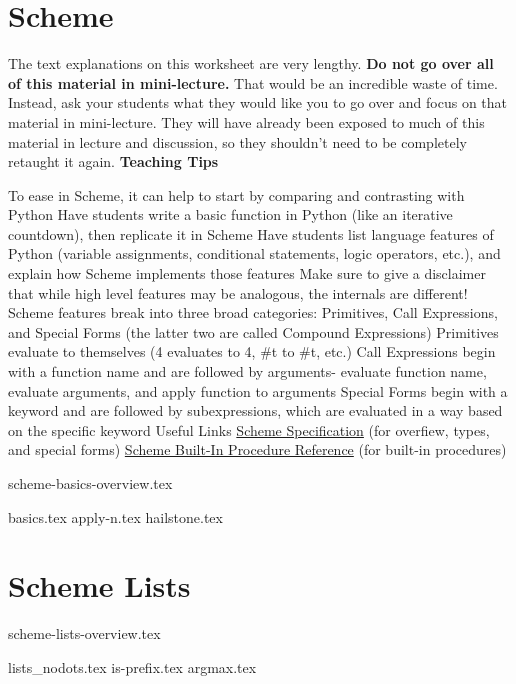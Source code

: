 \documentclass{exam}
\begin{document}
\section{Scheme}
\begin{meta}
The text explanations on this worksheet are very lengthy. \textbf{Do not go over all of this material in mini-lecture.} That would be an incredible waste of time. Instead, ask your students what they would like you to go over and focus on that material in mini-lecture. They will have already been exposed to much of this material in lecture and discussion, so they shouldn't need to be completely retaught it again. 
\textbf{Teaching Tips}
\begin{outline}[enumerate]
    \1 To ease in Scheme, it can help to start by comparing and contrasting with Python
    \2 Have students write a basic function in Python (like an iterative countdown), then replicate it in Scheme
    \2 Have students list language features of Python (variable assignments, conditional statements, logic operators, etc.), and explain how Scheme implements those features
    \2 Make sure to give a disclaimer that while high level features may be analogous, the internals are different!
    \1 Scheme features break into three broad categories: Primitives, Call Expressions, and Special Forms (the latter two are called Compound Expressions)
    \2 Primitives evaluate to themselves (4 evaluates to 4, \#t to \#t, etc.)
    \2 Call Expressions begin with a function name and are followed by arguments- evaluate function name, evaluate arguments, and apply function to arguments
    \2 Special Forms begin with a keyword and are followed by subexpressions, which are evaluated in a way based on the specific keyword
    \1 Useful Links
    \2 \href{https://cs61a.org/articles/scheme-spec/}{Scheme Specification} (for overfiew, types, and special forms)
    \2 \href{https://cs61a.org/articles/scheme-builtins/}{Scheme Built-In Procedure Reference} (for built-in procedures)
\end{outline}
\end{meta}

{scheme-basics-overview.tex}
\begin{questions}
{basics.tex}
{apply-n.tex}
{hailstone.tex}
\end{questions}

\section{Scheme Lists}
{scheme-lists-overview.tex}
\newpage
\begin{questions}
{lists_nodots.tex}
{is-prefix.tex}
{argmax.tex}


\end{questions}
\end{document}
